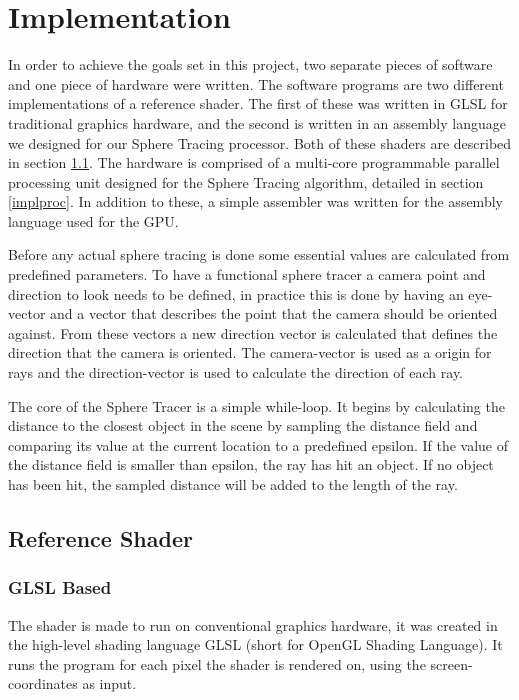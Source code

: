 \chapter{Implementation}

	In order to achieve the goals set in this project, two separate pieces of 
	software and one piece of hardware were written. The software programs are 
	two different implementations of a reference shader. The first of these was 
	written in GLSL for traditional graphics hardware, and the second is written
	in an assembly language we designed for our Sphere Tracing processor. Both of these 
	shaders are described in section \ref{implshader}. The hardware is 
	comprised of a multi-core programmable parallel processing unit designed 
	for the Sphere Tracing algorithm, detailed in section \ref{implproc}. In 
	addition to these, a simple assembler was written for the assembly language
	used for the GPU.

	Before any actual sphere tracing is done some essential values are calculated
	from predefined parameters. To have a functional sphere tracer a camera point
	and direction to look needs to be defined, in practice this is done by having
	an eye-vector and a vector that describes the point that the camera should
	be oriented against. From these vectors a new direction vector is calculated 
	that defines the direction that the camera is oriented. The camera-vector is 
	used as a origin for rays and the direction-vector is used to calculate 
	the direction of each ray. 

	The core of the Sphere Tracer is a simple while-loop. It begins by calculating the
	distance to the closest object in the scene by sampling the distance
	field and comparing its value at the current location to a predefined
	epsilon. If the value of the distance field is smaller than epsilon, the ray has hit
	an object. If no object has been hit, the sampled distance will be added to
	the length of the ray.

	\section{Reference Shader} \label{implshader}


		\subsection{GLSL Based}
	
			The shader is made to run on conventional graphics hardware,
			it was created in the high-level shading language GLSL (short for OpenGL
			Shading Language). It runs the program for each pixel the shader is
			rendered on, using the screen-coordinates as input.

